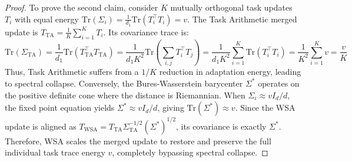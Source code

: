 \documentclass{article}
\theoremstyle{plain}
\theoremstyle{definition}
\theoremstyle{remark}
\begin{document}
\begin{proof}
To prove the second claim, consider $K$ mutually orthogonal task updates $T_i$ with equal energy $\text{Tr}(\Sigma_i) = \frac{1}{d_1} \text{Tr}(T_i^\top T_i) = v$. The Task Arithmetic merged update is $T_{\text{TA}} = \frac{1}{K} \sum_{i=1}^K T_i$. Its covariance trace is:
\begin{equation}
  \text{Tr}(\Sigma_{\text{TA}}) = \frac{1}{d_1} \text{Tr}(T_{\text{TA}}^\top T_{\text{TA}}) = \frac{1}{d_1 K^2} \text{Tr}\left( \sum_{i,j} T_i^\top T_j \right) = \frac{1}{d_1 K^2} \sum_{i=1}^K \text{Tr}(T_i^\top T_i) = \frac{1}{K^2} \sum_{i=1}^K v = \frac{v}{K}
\end{equation}
Thus, Task Arithmetic suffers from a $1/K$ reduction in adaptation energy, leading to spectral collapse.
Conversely, the Bures-Wasserstein barycenter $\Sigma^*$ operates on the positive definite cone where the distance is Riemannian. When $\Sigma_i \approx v I_d / d$, the fixed point equation yields $\Sigma^* \approx v I_d / d$, giving $\text{Tr}(\Sigma^*) \approx v$. Since the WSA update is aligned as $T_{\text{WSA}} = T_{\text{TA}} \Sigma_{\text{TA}}^{-1/2} (\Sigma^*)^{1/2}$, its covariance is exactly $\Sigma^*$. Therefore, WSA scales the merged update to restore and preserve the full individual task trace energy $v$, completely bypassing spectral collapse.
\end{proof}
\end{document}
